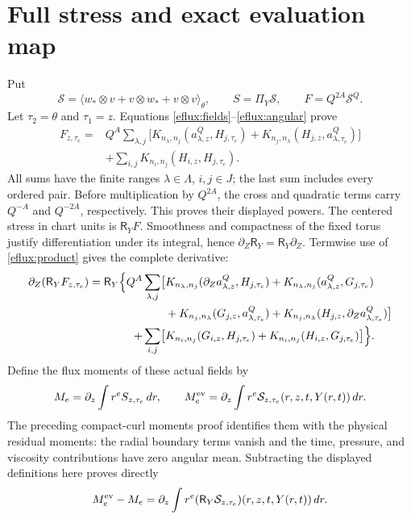 \section{Full stress and exact evaluation map}
\label{eflux:stress-section}
Put
\[
\mathcal S=\langle w_*\otimes v+v\otimes w_*+v\otimes v\rangle_\theta,
\qquad S=\Pi_Y\mathcal S,\qquad F=Q^{2A}\mathcal S^Q.
\]
Let $\tau_2=\theta$ and $\tau_1=z$. Equations
\eqref{eflux:fields}--\eqref{eflux:angular} prove
\begin{align}
F_{z,\tau_e}={}&Q^A\sum_{\lambda,j}
\bigl[K_{n_\lambda,n_j}(a^Q_{\lambda,z},H_{j,\tau_e})
+K_{n_j,n_\lambda}(H_{j,z},a^Q_{\lambda,\tau_e})\bigr]\nonumber\\
&+\sum_{i,j}K_{n_i,n_j}(H_{i,z},H_{j,\tau_e}).
\label{eflux:stress}
\end{align}
All sums have the finite ranges $\lambda\in\Lambda$, $i,j\in J$;
the last sum includes every ordered pair. Before multiplication by
$Q^{2A}$, the cross and quadratic terms carry $Q^{-A}$ and $Q^{-2A}$,
respectively. This proves their displayed powers.
The centered stress in chart units is $\mathsf R_YF$.
Smoothness and compactness of the fixed torus justify differentiation
under its integral, hence $\partial_Z\mathsf R_Y=\mathsf R_Y\partial_Z$.
Termwise use of \eqref{eflux:product} gives the complete derivative:
\begin{align}
\partial_Z(\mathsf R_YF_{z,\tau_e})=\mathsf R_Y\Bigl\{
Q^A\sum_{\lambda,j}\bigl[
&K_{n_\lambda,n_j}(\partial_Za^Q_{\lambda,z},H_{j,\tau_e})
+K_{n_\lambda,n_j}(a^Q_{\lambda,z},G_{j,\tau_e})\nonumber\\
&+K_{n_j,n_\lambda}(G_{j,z},a^Q_{\lambda,\tau_e})
+K_{n_j,n_\lambda}(H_{j,z},\partial_Za^Q_{\lambda,\tau_e})
\bigr]\nonumber\\
+\sum_{i,j}\bigl[
&K_{n_i,n_j}(G_{i,z},H_{j,\tau_e})
+K_{n_i,n_j}(H_{i,z},G_{j,\tau_e})\bigr]\Bigr\}.
\label{eflux:stress-derivative}
\end{align}
Define the flux moments of these actual fields by
\[
M_e=\partial_z\int r^eS_{z,\tau_e}\,dr,\qquad
M_e^{\rm ev}=\partial_z\int r^e
\mathcal S_{z,\tau_e}(r,z,t,Y(r,t))\,dr .
\]
The preceding compact-curl moments proof identifies them with the
physical residual moments: the radial boundary terms vanish and the
time, pressure, and viscosity contributions have zero angular mean.
Subtracting the displayed definitions here proves directly
\begin{equation}
M_e^{\rm ev}-M_e
=\partial_z\int r^e(\mathsf R_Y\mathcal S_{z,\tau_e})
(r,z,t,Y(r,t))\,dr .
\label{eflux:evaluation-identity}
\end{equation}
